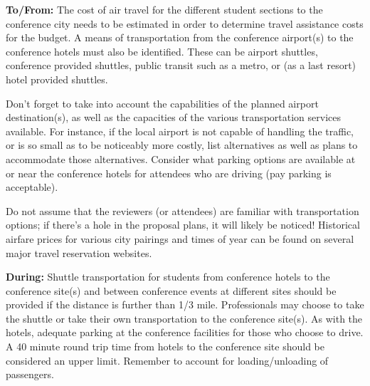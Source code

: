 \documentclass[12pt]{article}
\begin{document}
\textbf{To/From:} The cost of air travel for the different student sections to the conference city needs to be estimated in order to determine travel assistance costs for the budget. A means of transportation from the conference airport(s) to the conference hotels must also be identified. These can be airport shuttles, conference provided shuttles, public transit such as a metro, or (as a last resort) hotel provided shuttles.

Don't forget to take into account the capabilities of the planned airport destination(s), as well as the capacities of the various transportation services available. For instance, if the local airport is not capable of handling the traffic, or is so small as to be noticeably more costly, list alternatives as well as plans to accommodate those alternatives. Consider what parking options are available at or near the conference hotels for attendees who are driving (pay parking is acceptable).

Do not assume that the reviewers (or attendees) are familiar with transportation options; if there's a hole in the proposal plans, it will likely be noticed! Historical airfare prices for various city pairings and times of year can be found on several major travel reservation websites.

\textbf{During:} Shuttle transportation for students from conference hotels to the conference site(s) and between conference events at different sites should be provided if the distance is further than 1/3 mile. Professionals may choose to take the shuttle or take their own transportation to the conference site(s). As with the hotels, adequate parking at the conference facilities for those who choose to drive. A 40 minute round trip time from hotels to the conference site should be considered an upper limit. Remember to account for loading/unloading of passengers.
\end{document}
